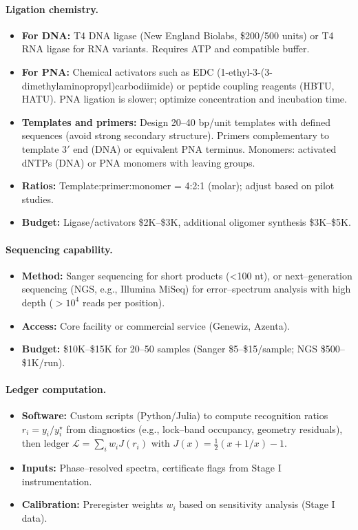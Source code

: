 \documentclass[11pt]{article}
\begin{document}
\paragraph{Ligation chemistry.}
\begin{itemize}
\item \textbf{For DNA:} T4 DNA ligase (New England Biolabs, \$200/500 units) or T4 RNA ligase for RNA variants. Requires ATP and compatible buffer.
\item \textbf{For PNA:} Chemical activators such as EDC (1-ethyl-3-(3-dimethylaminopropyl)carbodiimide) or peptide coupling reagents (HBTU, HATU). PNA ligation is slower; optimize concentration and incubation time.
\item \textbf{Templates and primers:} Design 20–40 bp/unit templates with defined sequences (avoid strong secondary structure). Primers complementary to template 3$'$ end (DNA) or equivalent PNA terminus. Monomers: activated dNTPs (DNA) or PNA monomers with leaving groups.
\item \textbf{Ratios:} Template:primer:monomer = 4:2:1 (molar); adjust based on pilot studies.
\item \textbf{Budget:} Ligase/activators \$2K–\$3K, additional oligomer synthesis \$3K–\$5K.
\end{itemize}

\paragraph{Sequencing capability.}
\begin{itemize}
\item \textbf{Method:} Sanger sequencing for short products (<100 nt), or next–generation sequencing (NGS, e.g., Illumina MiSeq) for error–spectrum analysis with high depth ($>10^4$ reads per position).
\item \textbf{Access:} Core facility or commercial service (Genewiz, Azenta).
\item \textbf{Budget:} \$10K–\$15K for 20–50 samples (Sanger \$5–\$15/sample; NGS \$500–\$1K/run).
\end{itemize}

\paragraph{Ledger computation.}
\begin{itemize}
\item \textbf{Software:} Custom scripts (Python/Julia) to compute recognition ratios $r_i=y_i/y_i^\star$ from diagnostics (e.g., lock–band occupancy, geometry residuals), then ledger $\mathcal{L}=\sum_i w_i J(r_i)$ with $J(x)=\tfrac12(x+1/x)-1$.
\item \textbf{Inputs:} Phase–resolved spectra, certificate flags from Stage I instrumentation.
\item \textbf{Calibration:} Preregister weights $w_i$ based on sensitivity analysis (Stage I data).
\end{itemize}
\end{document}
